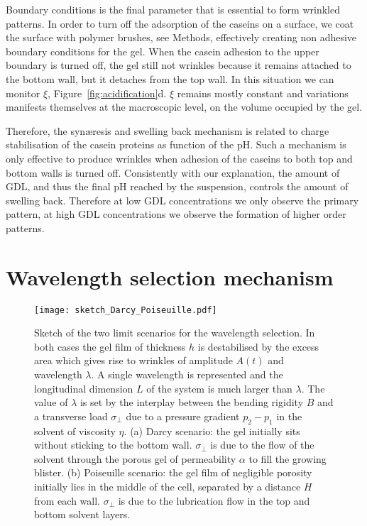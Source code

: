 \documentclass[twocolumn,superscriptaddress,showpacs,preprintnumbers,
amsmath,amssymb,prl]{revtex4-1}
\begin{document}
Boundary conditions is the final parameter that is essential to form wrinkled patterns. In order to turn off the adsorption of the caseins on a surface, we coat the surface with polymer brushes, see Methods, effectively creating non adhesive boundary conditions for the gel. When the casein adhesion to the upper boundary is turned off, the gel still not wrinkles because it remains attached to the bottom wall, but it detaches from the top wall. In this situation we can monitor $\xi$, Figure~\ref{fig:acidification}d. $\xi$ remains mostly constant and variations manifests themselves at the macroscopic level, on the volume occupied by the gel.


Therefore, the syn\ae{}resis and swelling back mechanism is related to charge stabilisation of the casein proteins as function of the pH. Such a mechanism is only effective to produce wrinkles when adhesion of the caseins to both top and bottom walls is turned off. Consistently with our explanation, the amount of GDL, and thus the final pH reached by the suspension, controls the amount of swelling back. Therefore at low GDL concentrations we only observe the primary pattern, at high GDL concentrations we observe the formation of higher order patterns.





\section*{Wavelength selection mechanism}

\begin{figure}
\texttt{[image: sketch\_Darcy\_Poiseuille.pdf]}
\caption{Sketch of the two limit scenarios for the wavelength selection. In both cases the gel film of thickness $h$ is destabilised by the excess area which gives rise to wrinkles of amplitude $A(t)$ and wavelength $\lambda$. A single wavelength is represented and the longitudinal dimension $L$ of the system is much larger than $\lambda$. The value of $\lambda$ is set by the interplay between the bending rigidity $B$ and a transverse load $\sigma_\perp$ due to a pressure gradient $p_2-p_1$ in the solvent of viscosity $\eta$. (a) Darcy scenario: the gel initially sits without sticking to the bottom wall. $\sigma_\perp$ is due to the flow of the solvent through the porous gel of permeability $\alpha$ to fill the growing blister. (b) Poiseuille scenario: the gel film of negligible porosity initially lies in the middle of the cell, separated by a distance $H$ from each wall. $\sigma_\perp$ is due to the lubrication flow in the top and bottom solvent layers.}
\label{fig:sketchDP}
\end{figure}
\end{document}
